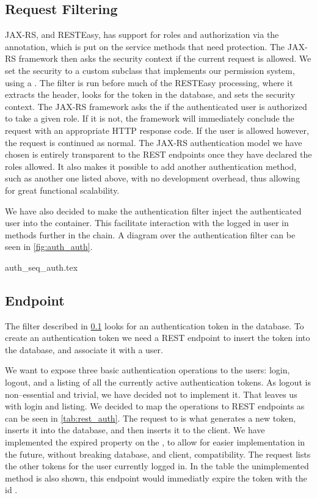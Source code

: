 \subsection{Request Filtering}
\label{subsec:auth_filter}

JAX-RS, and RESTEasy, has support for roles and authorization via the
 annotation, which is put on the service methods that need
protection. The JAX-RS framework then asks the security context if the current
request is allowed. We set the security to a custom subclass that implements our
permission system, using a . The filter is run
before much of the RESTEasy processing, where it extracts the header, looks for
the token in the database, and sets the security context. The JAX-RS framework
asks the  if the authenticated user is authorized to take
a given role. If it is not, the framework will immediately conclude the request
with an appropriate HTTP response code. If the user is allowed however, the
request is continued as normal. The JAX-RS authentication model we have chosen
is entirely transparent to the REST endpoints once they have declared the roles
allowed. It also makes it possible to add another authentication method, such as
another one listed above, with no development overhead, thus allowing for great
functional scalability.

We have also decided to make the authentication filter inject the authenticated
user into the container. This facilitate interaction with the logged in user in
methods further in the chain. A diagram over the authentication filter can be
seen in \cref{fig:auth_auth}.

{auth_seq_auth.tex}

\subsection{Endpoint}
The filter described in \cref{subsec:auth_filter} looks for an authentication
token in the database. To create an authentication token we need a REST endpoint
to insert the token into the database, and associate it with a user.

We want to expose three basic authentication operations to the users: login, logout,
and a listing of all the currently active authentication tokens. As logout is
non--essential and trivial, we have decided not to implement it. That leaves us
with login and listing. We decided to map the operations to REST endpoints as
can be seen in \cref{tab:rest_auth}. The  request to  is
what generates a new token, inserts it into the database, and then inserts it to
the client. We have implemented the expired property on the , to
allow for easier implementation in the future, without breaking database, and
client, compatibility. The  request lists the other tokens for the
user currently logged in. In the table the unimplemented  method is
also shown, this endpoint would immediatly expire the token with the id
.

